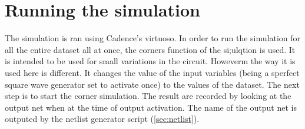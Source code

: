 \section{Running the simulation}\label{sec:run}

The simulation is ran using Cadence's virtuoso. In order to run the simulation for all the entire dataset all at once, the corners function of the si;ulqtion is used. It is intended to be used for small variations in the circuit. Howeverm the way it is used here is different. It changes the value of the input variables (being a sperfect square wave generator set to activate once) to the values of the dataset. The next step is to start the corner simulation. The result are recorded by looking at the output net when at the time of output activation. The name of the output net is outputed by the netlist generator script (\cref{sec:netlist}).
